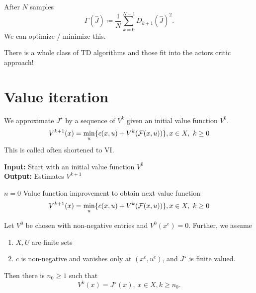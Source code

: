 After \(N\) samples 
\[\Gamma(\hat{J})\coloneqq \frac{1}{N}\sum_{k=0}^{N-1} D_{k+1}(\hat{J})^2.\]
We can optimize / minimize this.

There is a whole class of TD algorithms and those fit into the actors critic approach!


\section{Value iteration}

We approximate \(J^\star\) by a sequence of \(V^k\) given an initial value function \(V^0\).
\[V^{k+1}(x)=\min_{u}\{c(x,u)+V^k(\mathcal{F}(x,u))\}, x\in X,\ k\geq 0\]
This is called  often shortened to VI.

\begin{algorithm}[H]
    \caption{Value iteration}
    \textbf{Input:} Start with an initial value function \(V^0\)\\
    \textbf{Output:} Estimates \(V^{k+1}\)
    \begin{algorithmic}
    \State \(n=0\)
        \State Value function improvement to obtain next value function
            \[V^{k+1}(x)=\min_{u}\{c(x,u)+V^k(\mathcal{F}(x,u))\}, x\in X,\ k\geq 0\]
    \EndWhile
    \end{algorithmic}
\end{algorithm}

\begin{proposition}\label{prop:1.15}
    Let \(V^0\) be chosen with non-negative entries and \(V^0(x^e)=0\). Further,
    we assume
    \begin{enumerate}
        \item \(X,U\) are finite sets 
        \item \(c\) is non-negative and vanishes only at \((x^e,u^e)\), and \(J^\star\) is finite valued.
    \end{enumerate}
    Then there is \(n_0\geq 1\) such that 
    \[V^k(x)=J^\star(x), \ x\in X,k\geq n_0.\]
\end{proposition}

